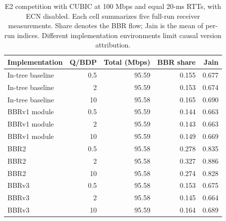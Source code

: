 \begin{table}[htbp]
\centering
\caption{E2 competition with CUBIC at 100 Mbps and equal 20-ms RTTs, with ECN disabled. Each cell summarizes five full-run receiver measurements. Share denotes the BBR flow; Jain is the mean of per-run indices. Different implementation environments limit causal version attribution.}
\label{tab:e2_results}
\small
\begin{tabular}{lrrrr}
\toprule
Implementation & Q/BDP & Total (Mbps) & BBR share & Jain \\
\midrule
In-tree baseline & 0.5 & 95.59 & 0.155 & 0.677 \\
In-tree baseline & 2 & 95.59 & 0.153 & 0.674 \\
In-tree baseline & 10 & 95.58 & 0.165 & 0.690 \\
BBRv1 module & 0.5 & 95.59 & 0.144 & 0.663 \\
BBRv1 module & 2 & 95.59 & 0.143 & 0.663 \\
BBRv1 module & 10 & 95.59 & 0.149 & 0.669 \\
BBR2 & 0.5 & 95.58 & 0.278 & 0.835 \\
BBR2 & 2 & 95.58 & 0.327 & 0.886 \\
BBR2 & 10 & 95.58 & 0.274 & 0.828 \\
BBRv3 & 0.5 & 95.58 & 0.153 & 0.675 \\
BBRv3 & 2 & 95.58 & 0.145 & 0.664 \\
BBRv3 & 10 & 95.59 & 0.164 & 0.689 \\
\bottomrule
\end{tabular}
\end{table}

